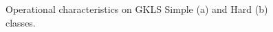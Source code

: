 \documentclass[runningheads]{llncs}
\begin{document}
\begin{figure}
\begin{minipage}{0.5\linewidth}
\end{minipage}
\hfill
\begin{minipage}{0.5\linewidth}
\end{minipage}
\caption{Operational characteristics on GKLS Simple (a) and Hard (b) classes.}
\label{oper}
\end{figure}
\end{document}
